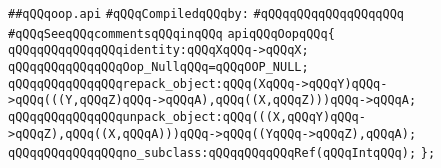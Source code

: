 \label{src/lib/src/oop.api}
\verb|##qQQqoop.api|\newline
\newline
\verb|#qQQqCompiledqQQqby:|\newline
\verb|#qQQqqQQqqQQqqQQqqQQq|\newline
\newline
\verb|#qQQqSeeqQQqcommentsqQQqinqQQq|\newline
\newline
\verb|apiqQQqOopqQQq{|\newline
\newline
\verb|qQQqqQQqqQQqqQQqidentity:qQQqXqQQq->qQQqX;|\newline
\newline
\verb|qQQqqQQqqQQqqQQqOop_NullqQQq=qQQqOOP_NULL;|\newline
\newline
\verb|qQQqqQQqqQQqqQQqrepack_object:qQQq(XqQQq->qQQqY)qQQq->qQQq(((Y,qQQqZ)qQQq->qQQqA),qQQq((X,qQQqZ)))qQQq->qQQqA;|\newline
\verb|qQQqqQQqqQQqqQQqunpack_object:qQQq(((X,qQQqY)qQQq->qQQqZ),qQQq((X,qQQqA)))qQQq->qQQq((YqQQq->qQQqZ),qQQqA);|\newline
\newline
\verb|qQQqqQQqqQQqqQQqno_subclass:qQQqqQQqqQQqRef(qQQqIntqQQq);|\newline
\verb|};|\newline
\newline

